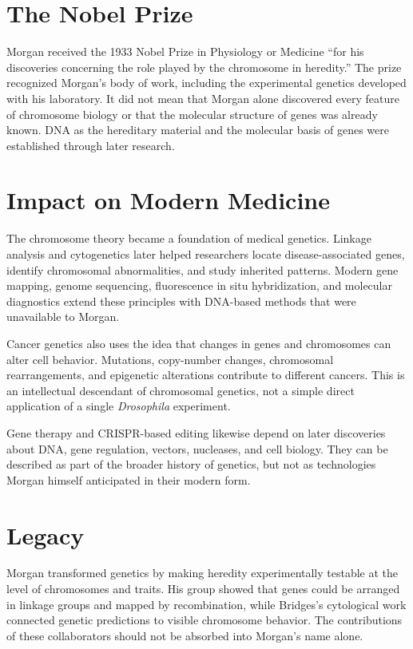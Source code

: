 \section{The Nobel Prize}

Morgan received the 1933 Nobel Prize in Physiology or Medicine ``for his discoveries concerning the role played by the chromosome in heredity.'' The prize recognized Morgan's body of work, including the experimental genetics developed with his laboratory. It did not mean that Morgan alone discovered every feature of chromosome biology or that the molecular structure of genes was already known. DNA as the hereditary material and the molecular basis of genes were established through later research.

\section{Impact on Modern Medicine}

The chromosome theory became a foundation of medical genetics. Linkage analysis and cytogenetics later helped researchers locate disease-associated genes, identify chromosomal abnormalities, and study inherited patterns. Modern gene mapping, genome sequencing, fluorescence in situ hybridization, and molecular diagnostics extend these principles with DNA-based methods that were unavailable to Morgan.

Cancer genetics also uses the idea that changes in genes and chromosomes can alter cell behavior. Mutations, copy-number changes, chromosomal rearrangements, and epigenetic alterations contribute to different cancers. This is an intellectual descendant of chromosomal genetics, not a simple direct application of a single \emph{Drosophila} experiment.

Gene therapy and CRISPR-based editing likewise depend on later discoveries about DNA, gene regulation, vectors, nucleases, and cell biology. They can be described as part of the broader history of genetics, but not as technologies Morgan himself anticipated in their modern form.

\section{Legacy}

Morgan transformed genetics by making heredity experimentally testable at the level of chromosomes and traits. His group showed that genes could be arranged in linkage groups and mapped by recombination, while Bridges's cytological work connected genetic predictions to visible chromosome behavior. The contributions of these collaborators should not be absorbed into Morgan's name alone.

